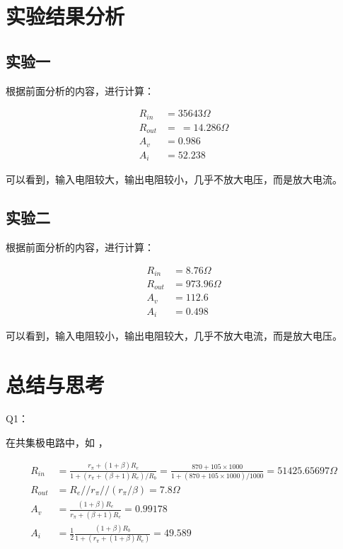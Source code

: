 \documentclass[lang=cn,11pt,a4paper,cite=authoryear]{elegantpaper}
\begin{document}
\section{实验结果分析}

\subsection{实验一}

根据前面分析的内容，进行计算： 

\[\begin{aligned}
    R_{in} &=   35643 \Omega\\
    R_{out} &= \ = 14.286 \Omega  \\
    A_v &= 0.986 \\
    A_i &= 52.238 
\end{aligned}\]

可以看到，输入电阻较大，输出电阻较小，几乎不放大电压，而是放大电流。

\subsection{实验二}


根据前面分析的内容，进行计算： 

\[\begin{aligned}
    R_{in} &=   8.76 \Omega\\
    R_{out} &= 973.96 \Omega  \\
    A_v &= 112.6 \\
    A_i &= 0.498 
\end{aligned}\]

可以看到，输入电阻较小，输出电阻较大，几乎不放大电流，而是放大电压。

\section{总结与思考}

Q1： 

在共集极电路中，如  ， 

\[\begin{aligned}
    R_{in} &=  \frac{r_\pi + (1+\beta)R_e}{1 + (r_\pi + (\beta + 1) R_e) / R_b}  = \frac{870 + 105 \times 1000}{1 + (870 + 105 \times 1000) / 1000} = 51425.65697 \Omega\\
    R_{out} &= R_e // r_\pi // (r_\pi / \beta) = 7.8 \Omega\\ 
    A_v &= \frac{(1+\beta) R_e}{r_\pi + (\beta + 1) R_e} = 0.99178 \\
    A_i &= \frac{1}{2}\frac{(1+\beta) R_b}{1 + (r_\pi + (1+\beta) R_e)} = 49.589
\end{aligned}\]
\end{document}
